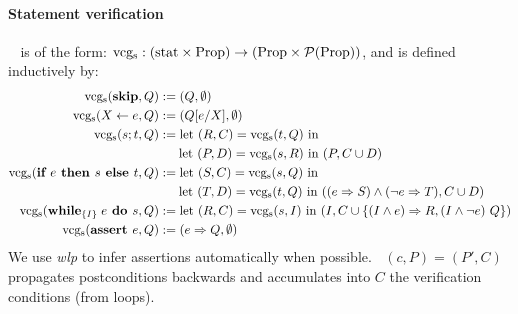 \documentclass[toc, titlepaged]{../cs-classes/cs-classes}
\DeclareMathOperator{\vcgs}{vcg_s}
\begin{document}
\paragraph*{Statement verification} 
$\vcgs$ is of the form: $\vcgs:(\textnormal{stat}\times\textnormal{Prop}) \rightarrow (\textnormal{Prop}\times\mathcal{P}(\textnormal{Prop}))$, and is defined inductively by:
\begin{equation*}
    \begin{aligned}
        \vcgs(\textnormal{\bf skip}, Q) &:= (Q, \emptyset)\\
        \vcgs(X\leftarrow e, Q) &:= (Q[e/X], \emptyset)\\
        \vcgs(s; t, Q) &:= \textnormal{let } (R, C) = \vcgs(t, Q)\textnormal{ in}\\ 
        &\;\;\quad\textnormal{let } (P, D) = \vcgs(s, R) \textnormal{ in } (P, C\cup D)\\
        \vcgs(\textnormal{\bf if } e \textnormal{\textbf{ then }} s \textnormal{\textbf{ else }} t, Q) &:= \textnormal{let } (S, C) = \vcgs(s, Q)\textnormal{ in}\\ 
        &\;\;\quad\textnormal{let } (T, D) = \vcgs(t, Q) \textnormal{ in } ((e\Rightarrow S) \land (\lnot e\Rightarrow T), C\cup D)\\
        \vcgs(\textnormal{\bf while}_{\{I\}} \; e \textnormal{\textbf{ do }} s, Q) &:= \textnormal{let } (R, C) = \vcgs(s, I)\textnormal{ in } (I, C\cup\{(I\land e) \Rightarrow R, (I\land \lnot e) \ Q\})\\
        \vcgs(\textbf{\bf assert } e, Q) &:= (e\Rightarrow Q, \emptyset)
    \end{aligned}
\end{equation*}
We use \emph{wlp} to infer assertions automatically when possible. $\vcgs(c, P)=(P', C)$ propagates postconditions backwards and accumulates into $C$ the verification conditions (from loops).
\end{document}
